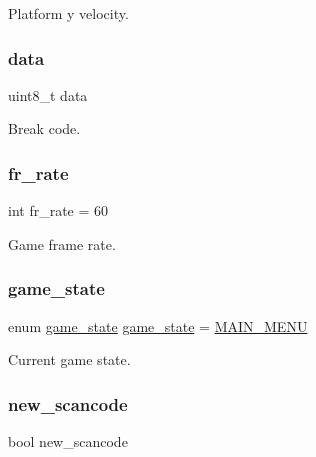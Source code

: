Platform y velocity. 

\mbox{\label{group__Proj_ga325819a8e492ac69542e8b31705af6e9}} 
\subsubsection{\texorpdfstring{data}{data}}
{\footnotesize\ttfamily uint8\+\_\+t data}



Break code. 

\mbox{\label{group__Proj_ga38b3017ff237979dfb1f8bac080e8b74}} 
\subsubsection{\texorpdfstring{fr\+\_\+rate}{fr\_rate}}
{\footnotesize\ttfamily int fr\+\_\+rate = 60}



Game frame rate. 

\mbox{\label{group__Proj_ga38caf7c28534bcd60ff95faf7fcae2d7}} 
\subsubsection{\texorpdfstring{game\+\_\+state}{game\_state}}
{\footnotesize\ttfamily enum \hyperlink{group__utils_gad0ed1832dd134806ad335cdcc1a59ad2}{game\+\_\+state} \hyperlink{group__utils_gad0ed1832dd134806ad335cdcc1a59ad2}{game\+\_\+state} = \hyperlink{group__utils_ggad0ed1832dd134806ad335cdcc1a59ad2ac22743f1fc74de09544ecc9bab74a17b}{M\+A\+I\+N\+\_\+\+M\+E\+NU}}



Current game state. 

\mbox{\label{group__Proj_ga96f7c2f0fe863bd78294a8f639e60478}} 
\subsubsection{\texorpdfstring{new\+\_\+scancode}{new\_scancode}}
{\footnotesize\ttfamily bool new\+\_\+scancode}



